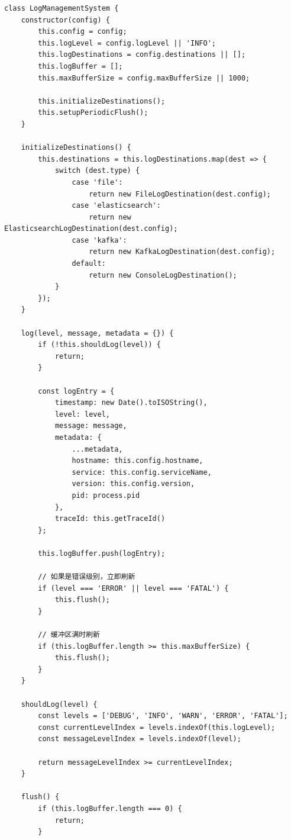 \begin{lstlisting}
class LogManagementSystem {
    constructor(config) {
        this.config = config;
        this.logLevel = config.logLevel || 'INFO';
        this.logDestinations = config.destinations || [];
        this.logBuffer = [];
        this.maxBufferSize = config.maxBufferSize || 1000;
        
        this.initializeDestinations();
        this.setupPeriodicFlush();
    }
    
    initializeDestinations() {
        this.destinations = this.logDestinations.map(dest => {
            switch (dest.type) {
                case 'file':
                    return new FileLogDestination(dest.config);
                case 'elasticsearch':
                    return new ElasticsearchLogDestination(dest.config);
                case 'kafka':
                    return new KafkaLogDestination(dest.config);
                default:
                    return new ConsoleLogDestination();
            }
        });
    }
    
    log(level, message, metadata = {}) {
        if (!this.shouldLog(level)) {
            return;
        }
        
        const logEntry = {
            timestamp: new Date().toISOString(),
            level: level,
            message: message,
            metadata: {
                ...metadata,
                hostname: this.config.hostname,
                service: this.config.serviceName,
                version: this.config.version,
                pid: process.pid
            },
            traceId: this.getTraceId()
        };
        
        this.logBuffer.push(logEntry);
        
        // 如果是错误级别，立即刷新
        if (level === 'ERROR' || level === 'FATAL') {
            this.flush();
        }
        
        // 缓冲区满时刷新
        if (this.logBuffer.length >= this.maxBufferSize) {
            this.flush();
        }
    }
    
    shouldLog(level) {
        const levels = ['DEBUG', 'INFO', 'WARN', 'ERROR', 'FATAL'];
        const currentLevelIndex = levels.indexOf(this.logLevel);
        const messageLevelIndex = levels.indexOf(level);
        
        return messageLevelIndex >= currentLevelIndex;
    }
    
    flush() {
        if (this.logBuffer.length === 0) {
            return;
        }
        

\end{lstlisting}
